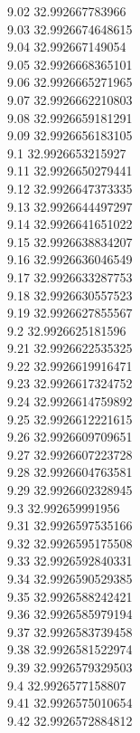 {9.02	32.992667783966\\
9.03	32.9926674648615\\
9.04	32.992667149054\\
9.05	32.9926668365101\\
9.06	32.9926665271965\\
9.07	32.9926662210803\\
9.08	32.9926659181291\\
9.09	32.9926656183105\\
9.1	32.9926653215927\\
9.11	32.9926650279441\\
9.12	32.9926647373335\\
9.13	32.9926644497297\\
9.14	32.9926641651022\\
9.15	32.9926638834207\\
9.16	32.9926636046549\\
9.17	32.9926633287753\\
9.18	32.9926630557523\\
9.19	32.9926627855567\\
9.2	32.9926625181596\\
9.21	32.9926622535325\\
9.22	32.9926619916471\\
9.23	32.9926617324752\\
9.24	32.9926614759892\\
9.25	32.9926612221615\\
9.26	32.9926609709651\\
9.27	32.9926607223728\\
9.28	32.9926604763581\\
9.29	32.9926602328945\\
9.3	32.992659991956\\
9.31	32.9926597535166\\
9.32	32.9926595175508\\
9.33	32.9926592840331\\
9.34	32.9926590529385\\
9.35	32.9926588242421\\
9.36	32.9926585979194\\
9.37	32.9926583739458\\
9.38	32.9926581522974\\
9.39	32.9926579329503\\
9.4	32.9926577158807\\
9.41	32.9926575010654\\
9.42	32.9926572884812\\
}
